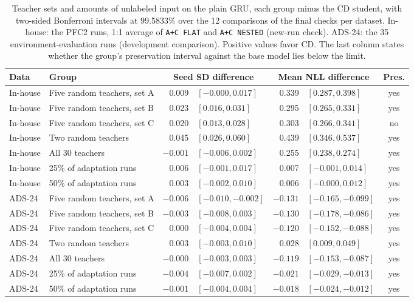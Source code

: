 \begin{table}[htbp]
\centering
\caption[Teacher sets and amounts of unlabeled input on the plain GRU]{Teacher sets and amounts of unlabeled input on the plain GRU,
each group minus the CD student, with two-sided Bonferroni intervals at
99.5833\% over the 12 comparisons of the final checks per dataset.
In-house: the PFC2 runs, 1:1 average of \texttt{A+C FLAT} and
\texttt{A+C NESTED} (new-run check). ADS-24: the 35
environment-evaluation runs (development comparison). Positive values
favor CD. The last column states whether the group's preservation
interval against the base model lies below the limit.}
\label{tab:gen-teachers}
\small
\begin{tabular}{@{}llrlrlc@{}}
\toprule
Data & Group & \multicolumn{2}{c}{Seed SD difference}
 & \multicolumn{2}{c}{Mean NLL difference} & Pres. \\
\midrule
In-house & Five random teachers, set A & 0.009 & $[-0.000, 0.017]$ & 0.339 & $[0.287, 0.398]$ & yes \\
In-house & Five random teachers, set B & 0.023 & $[0.016, 0.031]$ & 0.295 & $[0.265, 0.331]$ & yes \\
In-house & Five random teachers, set C & 0.020 & $[0.013, 0.028]$ & 0.303 & $[0.266, 0.341]$ & no \\
In-house & Two random teachers         & 0.045 & $[0.026, 0.060]$ & 0.439 & $[0.346, 0.537]$ & yes \\
In-house & All 30 teachers             & $-0.001$ & $[-0.006, 0.002]$ & 0.255 & $[0.238, 0.274]$ & yes \\
In-house & 25\% of adaptation runs     & 0.006 & $[-0.001, 0.017]$ & 0.007 & $[-0.001, 0.014]$ & yes \\
In-house & 50\% of adaptation runs     & 0.003 & $[-0.002, 0.010]$ & 0.006 & $[-0.000, 0.012]$ & yes \\
\midrule
ADS-24 & Five random teachers, set A & $-0.006$ & $[-0.010, -0.002]$ & $-0.131$ & $[-0.165, -0.099]$ & yes \\
ADS-24 & Five random teachers, set B & $-0.003$ & $[-0.008, 0.003]$ & $-0.130$ & $[-0.178, -0.086]$ & yes \\
ADS-24 & Five random teachers, set C & 0.000 & $[-0.004, 0.004]$ & $-0.120$ & $[-0.152, -0.088]$ & yes \\
ADS-24 & Two random teachers         & 0.003 & $[-0.003, 0.010]$ & 0.028 & $[0.009, 0.049]$ & yes \\
ADS-24 & All 30 teachers             & $-0.000$ & $[-0.003, 0.003]$ & $-0.119$ & $[-0.153, -0.087]$ & yes \\
ADS-24 & 25\% of adaptation runs     & $-0.004$ & $[-0.007, 0.002]$ & $-0.021$ & $[-0.029, -0.013]$ & yes \\
ADS-24 & 50\% of adaptation runs     & $-0.001$ & $[-0.004, 0.004]$ & $-0.018$ & $[-0.024, -0.012]$ & yes \\
\bottomrule
\end{tabular}
\end{table}
